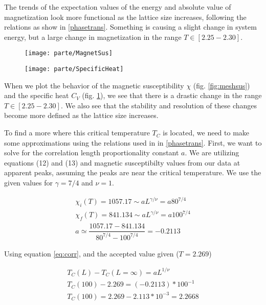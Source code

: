 \documentclass[a4paper]{article}
\begin{document}
The trends of the expectation values of the energy and absolute value of magnetization look more functional as the lattice size increases, following the relations as show in \ref{phasetrans}. Something is causing a slight change in system energy, but a large change in magnetization in the range $T \in [2.25 - 2.30]$.

\begin{figure}[ht!]
\centering
\begin{minipage}[t]{0.45\textwidth}
\centering
\texttt{[image: parte/MagnetSus]}
\label{fig:meshsus}
\end{minipage}
\begin{minipage}[t]{0.45\textwidth}
\centering
\texttt{[image: parte/SpecificHeat]}
\label{fig:meshspecheat}
\end{minipage}
\end{figure}

When we plot the behavior of the magnetic susceptibility $\chi$ (fig. \ref{fig:meshsus}) and the specific heat $C_V$ (fig. \ref{fig:meshspecheat}), we see that there is a drastic change in the range $T \in [2.25 - 2.30]$. We also see that the stability and resolution of these changes become more defined as the lattice size increases. 

To find a more where this critical temperature $T_C$ is located, we need to make some approximations using the relations used in in \ref{phasetrans}. First, we want to solve for the correlation length proportionality constant $a$. We are utilizing equations (12) and (13) and magnetic susceptibilty values from our data at apparent peaks, assuming the peaks are near the critical temperature. We use the given values for $\gamma = 7/4$ and $\nu = 1$.

\begin{align*}
\chi_i(T) = 1057.17 \sim aL^{\gamma/\nu} = a80^{7/4}\\
\chi_f(T) = 841.134 \sim aL^{\gamma/\nu} = a100^{7/4}\\
a \simeq \dfrac{1057.17-841.134}{80^{7/4}-100^{7/4}} = -0.2113
\end{align*}

\clearpage

Using equation \ref{eq:corr}, and the accepted value given ($T = 2.269$)

\begin{align*}
T_C(L) - T_C(L = \infty) = aL^{1/\nu}\\
T_C(100) - 2.269 = (-0.2113)*100^{-1}\\
T_C(100) = 2.269 - 2.113*10^{-3} = 2.2668
\end{align*}
\end{document}
